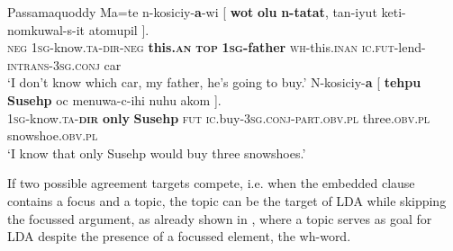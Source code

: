 \documentclass[output=paper
,modfonts
,nonflat]{langsci/langscibook}
\begin{document}
\begin{exe}
\ex Passamaquoddy \citep[][282]{Bruening2001a}
	\xlist
	\ex \label{ex:passam_topmark}
		\gll Ma=te n-kosiciy-\textbf{a}-wi [ \textbf{wot} \textbf{olu} \textbf{n-tatat}, tan-iyut keti-nomkuwal-s-it atomupil ].\\
			 \textsc{neg} \textsc{1sg}-know.\textsc{ta-dir-neg} {} \textbf{this.\textsc{an}} \textbf{\textsc{top}} \textbf{\textsc{1sg}-father} \textsc{wh}-this.\textsc{inan} \textsc{ic.fut}-lend-\textsc{intrans-3sg.conj} car\\
		\glt `I don't know which car, my father, he's going to buy.'
	\ex \label{ex:passam_focmark}
		\gll N-kosiciy-\textbf{a} [ \textbf{tehpu} \textbf{Susehp} oc menuwa-c-ihi nuhu akom ].\\
			 \textsc{1sg}-know.\textsc{ta-\textbf{dir}} {} \textbf{only} \textbf{Susehp} \textsc{fut} \textsc{ic}.buy-\textsc{3sg.conj-part.obv.pl} three.\textsc{obv.pl} snowshoe.\textsc{obv.pl}\\
		\glt `I know that only Susehp would buy three snowshoes.'
	\endxlist
\end{exe}
If two possible agreement targets compete, i.e. when the embedded clause contains a focus and a topic, the topic can be the target of LDA while skipping the focussed argument, as already shown in , where a topic serves as goal for LDA despite the presence of a focussed element, the wh-word.\pagebreak
\end{document}
